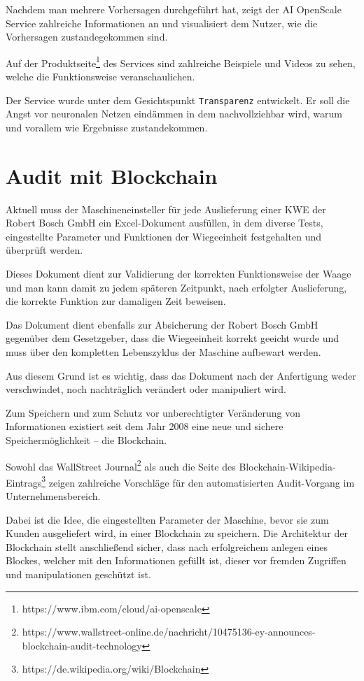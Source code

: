Nachdem man mehrere Vorhersagen durchgeführt hat, zeigt der AI OpenScale Service zahlreiche Informationen an und
visualisiert dem Nutzer, wie die Vorhersagen zustandegekommen sind.

Auf der Produktseite\footnote{https://www.ibm.com/cloud/ai-openscale} des Services sind zahlreiche Beispiele und Videos
zu sehen, welche die Funktionsweise veranschaulichen.

Der Service wurde unter dem Gesichtspunkt \texttt{Transparenz} entwickelt. Er soll die Angst vor neuronalen Netzen
eindämmen in dem nachvollziehbar wird, warum und vorallem wie Ergebnisse zustandekommen.

\section{Audit mit Blockchain}
Aktuell muss der Maschineneinsteller für jede Auslieferung einer KWE der Robert Bosch GmbH ein Excel-Dokument ausfüllen,
in dem diverse Tests, eingestellte Parameter und Funktionen der Wiegeeinheit festgehalten und überprüft werden.

Dieses Dokument dient zur Validierung der korrekten Funktionsweise der Waage und man kann damit zu jedem späteren
Zeitpunkt, nach erfolgter Auslieferung, die korrekte Funktion zur damaligen Zeit beweisen.

Das Dokument dient ebenfalls zur Absicherung der Robert Bosch GmbH gegenüber dem Gesetzgeber, dass die Wiegeeinheit
korrekt geeicht wurde und muss über den kompletten Lebenszyklus der Maschine aufbewart werden.

Aus diesem Grund ist es wichtig, dass das Dokument nach der Anfertigung weder verschwindet, noch nachträglich verändert
oder manipuliert wird.

Zum Speichern und zum Schutz vor unberechtigter Veränderung von Informationen existiert seit dem Jahr 2008 eine neue
und sichere Speichermöglichkeit -- die Blockchain.

Sowohl das WallStreet
Journal\footnote{https://www.wallstreet-online.de/nachricht/10475136-ey-announces-blockchain-audit-technology} als auch
die Seite des Blockchain-Wikipedia-Eintrags\footnote{https://de.wikipedia.org/wiki/Blockchain} zeigen zahlreiche
Vorschläge für den automatisierten Audit-Vorgang im Unternehmensbereich.

Dabei ist die Idee, die eingestellten Parameter der Maschine, bevor sie zum Kunden ausgeliefert wird, in einer
Blockchain zu speichern. Die Architektur der Blockchain stellt anschließend sicher, dass nach erfolgreichem anlegen
eines Blockes, welcher mit den Informationen gefüllt ist, dieser vor fremden Zugriffen und manipulationen geschützt ist.

